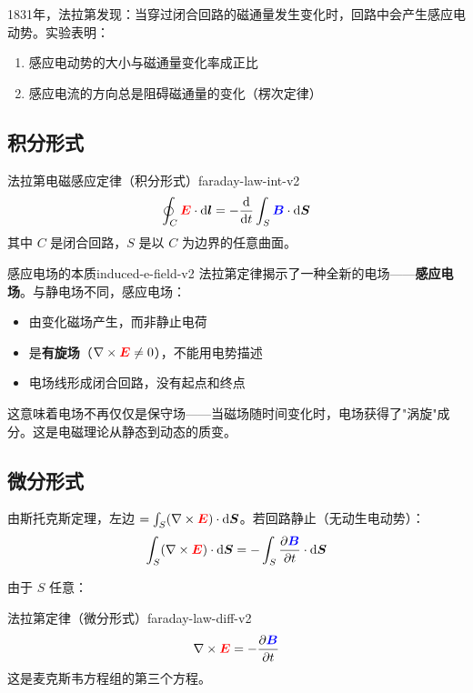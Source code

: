 \documentclass[11pt,a4paper,openany,oneside]{book}
\newcommand{\diff}{\mathrm{d}}
\newcommand{\vecE}{\textcolor{red}{\vect{E}}}
\newcommand{\vecB}{\textcolor{blue}{\vect{B}}}
\newcommand{\vect}[1]{\bm{#1}}
\newcommand{\curl}{\nabla\times}
\begin{document}
1831年，法拉第发现：当穿过闭合回路的磁通量发生变化时，回路中会产生感应电动势。实验表明：
\begin{enumerate}
\item 感应电动势的大小与磁通量变化率成正比
\item 感应电流的方向总是阻碍磁通量的变化（楞次定律）
\end{enumerate}

\subsection{积分形式}

\begin{theorem}{法拉第电磁感应定律（积分形式）}{faraday-law-int-v2}
\[
\oint_C \vecE \cdot \diff\vect{l} = -\frac{\diff}{\diff t} \int_S \vecB \cdot \diff\vect{S}
\]
其中 $C$ 是闭合回路，$S$ 是以 $C$ 为边界的任意曲面。
\end{theorem}

\begin{insight}{感应电场的本质}{induced-e-field-v2}
法拉第定律揭示了一种全新的电场——\textbf{感应电场}。与静电场不同，感应电场：
\begin{itemize}
\item 由变化磁场产生，而非静止电荷
\item 是\textbf{有旋场}（$\curl\vecE \neq 0$），不能用电势描述
\item 电场线形成闭合回路，没有起点和终点
\end{itemize}

这意味着电场不再仅仅是保守场——当磁场随时间变化时，电场获得了"涡旋"成分。这是电磁理论从静态到动态的质变。
\end{insight}

\subsection{微分形式}

由斯托克斯定理，左边 $= \int_S (\curl\vecE)\cdot\diff\vect{S}$。若回路静止（无动生电动势）：
\[
\int_S (\curl\vecE)\cdot\diff\vect{S} = -\int_S \frac{\partial\vecB}{\partial t}\cdot\diff\vect{S}
\]

由于 $S$ 任意：

\begin{theorem}{法拉第定律（微分形式）}{faraday-law-diff-v2}
\begin{equation}\curl\vecE = -\frac{\partial\vecB}{\partial t}\label{eq:faraday}\end{equation}
这是麦克斯韦方程组的第三个方程。
\end{theorem}
\end{document}
